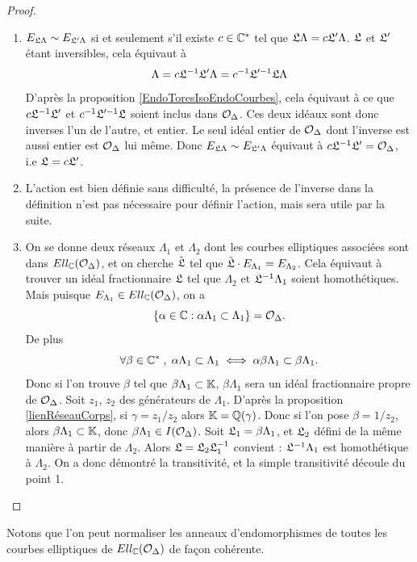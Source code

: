 \begin{proof}
	\begin{enumerate}
		\item $E_{\mathfrak{L}\Lambda} \sim E_{\mathfrak{L}'\Lambda}$ si et seulement s'il existe $c\in\mathbb{C}^{*}$ tel que $\mathfrak{L}\Lambda = c\mathfrak{L}'\Lambda$. $\mathfrak{L}$ et $\mathfrak{L}'$ étant inversibles, cela équivaut à 
		\begin{equation*}
			\Lambda = c\mathfrak{L}^{-1}\mathfrak{L}'\Lambda = c^{-1}\mathfrak{L}'^{-1}\mathfrak{L}\Lambda
		\end{equation*}
		D'après la proposition \ref{EndoToresIsoEndoCourbes}, cela équivaut à ce que $c\mathfrak{L}^{-1}\mathfrak{L}'$ et $c^{-1}\mathfrak{L}'^{-1}\mathfrak{L}$ soient inclus dans $\mathcal{O}_{\Delta}$. Ces deux idéaux sont donc inverses l'un de l'autre, et entier. Le seul idéal entier de $\mathcal{O}_{\Delta}$ dont l'inverse est aussi entier est $\mathcal{O}_{\Delta}$ lui même. Donc $E_{\mathfrak{L}\Lambda} \sim E_{\mathfrak{L}'\Lambda}$ équivaut à $c\mathfrak{L}^{-1}\mathfrak{L}' = \mathcal{O}_{\Delta}$, i.e $\mathfrak{L} = c\mathfrak{L}'$. 
		
		\item L'action est bien définie sans difficulté, la présence de l'inverse dans la définition n'est pas nécessaire pour définir l'action, mais sera utile par la suite. 
		
		\item On se donne deux réseaux $\Lambda_1$ et $\Lambda_2$ dont les courbes elliptiques associées sont dans $Ell_{\mathbb{C}}(\mathcal{O}_{\Delta})$, et on cherche $\tilde{\mathfrak{L}}$ tel que $\tilde{\mathfrak{L}}\cdot E_{\Lambda_1} = E_{\Lambda_2}$. Cela équivaut à trouver un idéal fractionnaire $\mathfrak{L}$ tel que $\Lambda_2$ et $\mathfrak{L}^{-1}\Lambda_1$ soient homothétiques. Mais puisque $E_{\Lambda_1}\in Ell_{\mathbb{C}}(\mathcal{O}_{\Delta})$, on a
		\begin{equation*}
			\left\lbrace \alpha\in\mathbb{C} : \alpha\Lambda_1\subset\Lambda_1\right\rbrace = \mathcal{O}_{\Delta}.
		\end{equation*}
		De plus 
		\begin{equation*}
			\forall \beta\in\mathbb{C}^{*}\;,\; \alpha\Lambda_1\subset\Lambda_1\iff\alpha\beta\Lambda_1\subset\beta\Lambda_1.
		\end{equation*}
		Donc si l'on trouve $\beta$ tel que $\beta\Lambda_1\subset\mathbb{K}$, $\beta\Lambda_1$ sera un idéal fractionnaire propre de $\mathcal{O}_{\Delta}$. Soit $z_1$, $z_2$ des générateurs de $\Lambda_1$. D'après la proposition \ref{lienRéseauCorps}, si $\gamma = z_1/z_2$ alors $\mathbb{K} = \mathbb{Q}(\gamma)$. Donc si l'on pose $\beta = 1/z_2$, alors $\beta\Lambda_1\subset\mathbb{K}$, donc $\beta\Lambda_1\in I(\mathcal{O}_\Delta)$. Soit $\mathfrak{L}_1 = \beta\Lambda_1$, et $\mathfrak{L}_2$ défini de la même manière à partir de $\Lambda_2$. Alors $\mathfrak{L} = \mathfrak{L}_2\mathfrak{L}_1^{-1}$ convient : $\mathfrak{L}^{-1}\Lambda_1$ est homothétique à $\Lambda_2$. On a donc démontré la transitivité, et la simple transitivité découle du point 1.
	\end{enumerate}
\end{proof}
Notons que l'on peut normaliser les anneaux d'endomorphismes de toutes les courbes elliptiques de $Ell_{\mathbb{C}}(\mathcal{O}_{\Delta})$ de façon cohérente.

